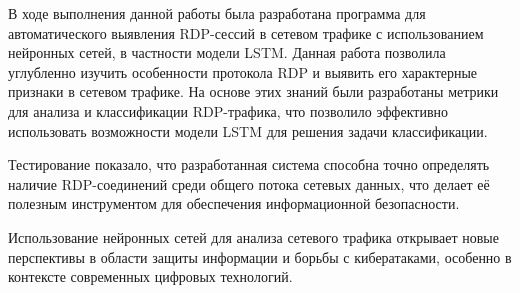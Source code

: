 \documentclass[bachelor, och, coursework]{SCWorks}
\begin{document}



\conclusion
  
В ходе выполнения данной работы была разработана программа для автоматического выявления RDP-сессий в сетевом трафике с 
использованием нейронных сетей, в частности модели LSTM. Данная работа позволила углубленно изучить особенности протокола 
RDP и выявить его характерные признаки в сетевом трафике. На основе этих знаний были разработаны метрики для анализа и 
классификации RDP-трафика, что позволило эффективно использовать возможности модели LSTM для решения задачи классификации.

Тестирование показало, что разработанная система способна точно определять наличие RDP-соединений среди общего потока сетевых 
данных, что делает её полезным инструментом для обеспечения информационной безопасности.

Использование нейронных сетей для анализа сетевого трафика открывает новые перспективы в области защиты информации и борьбы 
с кибератаками, особенно в контексте современных цифровых технологий.
\end{document}
